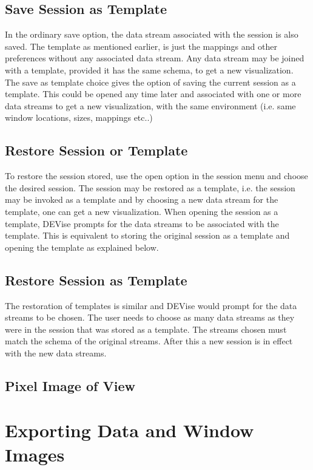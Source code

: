 \subsection{Save Session as Template}

In the ordinary save option, the data stream associated with the session is also saved. The template as mentioned earlier, is just the mappings and other preferences without any associated data stream. Any data stream may be joined with a template, provided it has the same schema, to get a new visualization. The save as template choice  gives the option of saving the current session as a template. This could be opened any time later and associated with one or more data streams to get a new  visualization, with the same environment (i.e. same window locations, sizes, mappings etc..) 

\subsection{Restore Session or Template}

To restore the session stored, use the open option in the session menu and choose the desired session. The session may be restored as a template, i.e. the session may be invoked as a template and by choosing a new data stream for the template, one can get a new visualization. When opening the session as a template, DEVise prompts for the data streams to be associated with the template. This is equivalent to storing the original session as a template and opening the template as explained below.

\subsection{Restore Session as Template}

The restoration of templates is similar and DEVise would prompt  for the data streams to be chosen. The user needs to choose as many data streams as they were in the session that was stored as a template. The streams chosen must match the schema of the original streams. After this a new session is in effect with the new data streams.

\subsection{Pixel Image of View}


\section{Exporting Data and Window Images}

